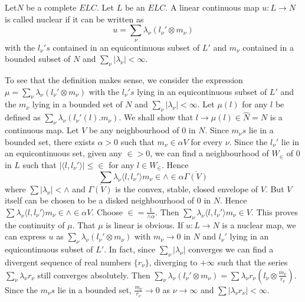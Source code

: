 \begin{definition}\label{chap13:def13.2}
Let\pageoriginale $N$ be a complete $E L C$. Let $L$ be an $E L C$. A linear
continuous map $u : L \to N$ is called nuclear if it can be written as 
$$
u = \sum\limits_\nu \lambda_\nu (l_\nu' \otimes m_\nu)
$$
with the $l_\nu's$ contained in an equicontinuous subset of $L'$ and
$m_\nu$ contained in a bounded subset of $N$ and $\sum\limits_\nu
|\lambda_\nu| < \infty$.

To see that the definition makes sense, we consider the expression
$\mu = \sum\limits_\nu \lambda_\nu (l_\nu' \otimes m_\nu)$ with the
$l_\nu's$ lying in an equicontinuous subset of $L'$ and the $m_\nu$
lying in a bounded set of $N$ and $\sum\limits_\nu |\lambda_\nu | <
\infty$. Let $\mu (l)$ for any $l$ be defined as $\sum\limits_\nu
\lambda_\nu (l_\nu'(l).m_\nu)$. We shall show that $l \to \mu(l) \in
\hat{N} = N$ is a continuous map. Let $V$ be any neighbourhood of $0$
in $N$. Since $m_\nu s$ lie in a bounded set, there exists $\alpha >
0$ such that $m_\nu \in \alpha V$ for every $\nu$. Since the $l_\nu'$
lie in an equicontinuous set, given any $\in > 0$, we can find
a neighbourhood of $W_\in$ of $0$ in $L$ such that $|\langle l,
l_\nu' \rangle | \leq \in$ for any $l \in W_\in$. Hence 
$$
 \sum \lambda_\nu \langle l, l_\nu'\rangle m_\nu \in \wedge
 \in \alpha \overline{\Gamma(V)}
$$
where $\sum |\lambda_\nu | < \wedge$ and $\overline{\Gamma(V)}$ is the
convex, stable, closed envelope of $V$. But $V$ itself can be chosen
to be a disked neighbourhood of $0$ in $N$. Hence  $\sum \lambda_\nu
\langle l, l_\nu' \rangle m_\nu \in \wedge \in \alpha
V$. Choose $\in = \frac{1}{\wedge \alpha}$. Then
$\sum\limits_\nu \lambda_\nu \langle l, l_\nu' \rangle m_\nu \in
V$. This proves the continuity of $\mu$. That $\mu$ is linear is
obvious. If $u : L \to N$ is a nuclear map, we can express $u$ as
$\sum\limits_\nu \lambda_\nu (l_\nu' \otimes m_\nu)$ with $m_\nu \to
0$ in $N$ and $l_\nu'$ lying in an equicontinuous subset of $L'$. In
fact, since $\sum\limits_\nu |\lambda_\nu |$ converges we can find a
divergent sequence of real numbers $\{r_\nu\}$, diverging to $+
\infty$ such that the series $\sum\limits_\nu \lambda_\nu r_\nu$ still
converges absolutely. Then $\sum\limits_\nu \lambda_\nu (l_\nu'
\otimes m_\nu) = \sum \lambda_\nu r_\nu (l_\nu \otimes
\frac{m_\nu}{r_\nu})$. Since the $m_\nu s$ lie in a bounded set,
$\frac{m_\nu}{r_\nu} \to 0$ as $\nu \to \infty$ and $\sum |\lambda_\nu
r_\nu | < \infty$. 
\end{definition}

